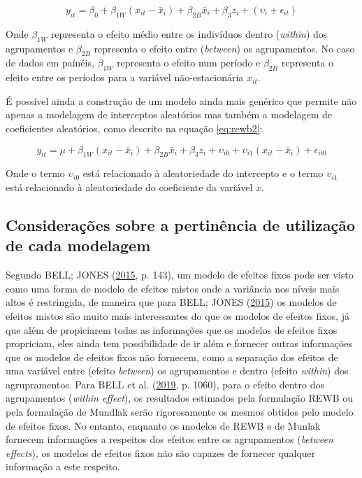 \documentclass[
  a4paper, 12pt]{article}
\begin{document}
\begin{equation} \label{eq:rewb}
y_{it} = \beta_0 + \beta_{1W} (x_{it} - \bar{x}_i) + \beta_{2B}\bar{x}_i+ \beta_3 z_i + (\upsilon_i + \epsilon_{it}) 
\end{equation}

Onde \(\beta_{1W}\) representa o efeito médio entre os indivíduos dentro
(\emph{within}) dos agrupamentos e \(\beta_{2B}\) representa o efeito
entre (\emph{between}) os agrupamentos. No caso de dados em paínéis,
\(\beta_{1W}\) representa o efeito num período e \(\beta_{2B}\)
representa o efeito entre os períodos para a variável não-estacionária
\(x_{it}\).

É possível ainda a construção de um modelo ainda mais genérico que
permite não apenas a modelagem de interceptos aleatórios mas também a
modelagem de coeficientes aleatórios, como descrito na equação
\ref{eq:rewb2}:

\begin{equation} \label{eq:rewb2}
y_{it} = \mu + \beta_{1W} (x_{it} - \bar{x}_i) + \beta_{2B}\bar{x}_i+ 
\beta_3 z_i + \upsilon_{i0} + \upsilon_{i1} (x_{it} - \bar{x}_i) + \epsilon_{it0} 
\end{equation}

Onde o termo \(\upsilon_{i0}\) está relacionado à aleatoriedade do
intercepto e o termo \(\upsilon_{i1}\) está relacionado à aleatoriedade
do coeficiente da variável \(x\).

\hypertarget{considerauxe7uxf5es-sobre-a-pertinuxeancia-de-utilizauxe7uxe3o-de-cada-modelagem}{%
\subsection{Considerações sobre a pertinência de utilização de cada
modelagem}\label{considerauxe7uxf5es-sobre-a-pertinuxeancia-de-utilizauxe7uxe3o-de-cada-modelagem}}

Segundo BELL; JONES (\protect\hyperlink{ref-bell2015}{2015}, p. 143), um
modelo de efeitos fixos pode ser visto como uma forma de modelo de
efeitos mistos onde a variância nos níveis mais altos é restringida, de
maneira que para BELL; JONES (\protect\hyperlink{ref-bell2015}{2015}) os
modelos de efeitos mistos são muito mais interessantes do que os modelos
de efeitos fixos, já que além de propiciarem todas as informações que os
modelos de efeitos fixos propriciam, eles ainda tem possibilidade de ir
além e fornecer outras informações que os modelos de efeitos fixos não
fornecem, como a separação dos efeitos de uma variável entre (efeito
\emph{between}) os agrupamentos e dentro (efeito \emph{within}) dos
agrupramentos. Para BELL et al. (\protect\hyperlink{ref-bell2019}{2019},
p. 1060), para o efeito dentro dos agrupamentos (\emph{within effect}),
os resultados estimados pela formulação REWB ou pela formulação de
Mundlak serão rigorosamente os mesmos obtidos pelo modelo de efeitos
fixos. No entanto, enquanto os modelos de REWB e de Munlak fornecem
informações a respeitos dos efeitos entre os agrupamentos (\emph{between
effects}), os modelos de efeitos fixos não são capazes de fornecer
qualquer informação a este respeito.
\end{document}
